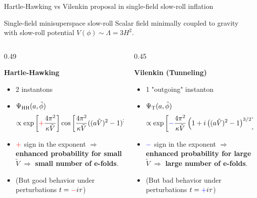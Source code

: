 \documentclass[aspectratio=169,smaller]{beamer}%
\begin{document}
\begin{frame}{Hartle-Hawking vs Vilenkin proposal in single-field slow-roll inflation}
	\begin{block}{Single-field minisuperspace slow-roll}
		Scalar field minimally coupled to gravity with slow-roll potential $V(\phi)\sim \Lambda=3H^2$.
	\end{block}
		\vspace{-0.15cm}
	\pause
	\begin{columns}
		\begin{column}{0.49\textwidth}
				\begin{block}{}
					\textbf{Hartle-Hawking}
					\begin{itemize}
						\item 2 instantons
						\item $\Psi_{\rm HH}(a,\tilde{\phi}) $ \begin{equation*}
						\propto \exp\left[{\color{red}+}\frac{4\pi^2}{\kappa \tilde{V}}\right]\cos\left[\frac{4\pi^2}{\kappa \tilde{V}}((a \tilde{V})^2-1)^{3/2}-\frac{\pi}{4}\right]\,.
					\end{equation*}
					\item $\color{red}+$ sign in the exponent $\Rightarrow$ \textbf{enhanced probability for small $\tilde{V}$} $\Rightarrow$ \textbf{small number of e-folds}.
					\item (But good behavior under perturbations $t = {\color{red}-}i \tau$)
					\end{itemize}
				\end{block}
		\end{column}
		\pause
		\begin{column}{0.45\textwidth}
				\begin{block}{}
					\textbf{Vilenkin (Tunneling)}
					\begin{itemize}
						\item 1 "outgoing" instanton
						\item $\Psi_{\rm T}(a,\tilde{\phi}) $ \begin{equation*}
						\propto \exp\left[{\color{blue}-}\frac{4\pi^2}{\kappa \tilde{V}}\left(1+i\left((a\tilde{V})^2-1\right)^{3/2}\right)\right]\,.
					\end{equation*}
					\item $\color{blue}-$ sign in the exponent $\Rightarrow$ \textbf{enhanced probability for large $\tilde{V}$} $\Rightarrow$ \textbf{large number of e-folds}.
					\item (But bad behavior under perturbations $t = {\color{blue}+}i\tau$)
					\end{itemize}
				\end{block}
			
		\end{column}
	\end{columns}
\end{frame}
\end{document}
